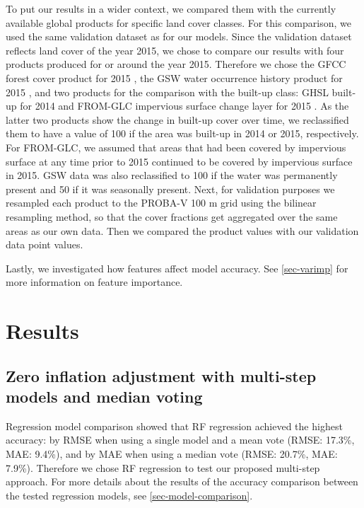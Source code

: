 \documentclass[review,authoryear,3p]{elsarticle}
\begin{document}
To put our results in a wider context, we compared them with the currently available global products for specific land cover classes.
For this comparison, we used the same validation dataset as for our models.
Since the validation dataset reflects land cover of the year 2015, we chose to compare our results with four products produced for or around the year 2015.
Therefore we chose the \gls{GFCC} forest cover product for 2015 \citep{townshend_global_2017}, the \gls{GSW} water occurrence history product for 2015 \citep{pekel_high-resolution_2016}, and two products for the comparison with the built-up class: \gls{GHSL} built-up for 2014 \citep{corbane_automated_2019} and \gls{FROM-GLC} impervious surface change layer for 2015 \citep{gong_annual_2020}.
As the latter two products show the change in built-up cover over time, we reclassified them to have a value of 100 if the area was built-up in 2014 or 2015, respectively.
For \gls{FROM-GLC}, we assumed that areas that had been covered by impervious surface at any time prior to 2015 continued to be covered by impervious surface in 2015.
\gls{GSW} data was also reclassified to 100 if the water was permanently present and 50 if it was seasonally present.
Next, for validation purposes we resampled each product to the PROBA-V 100 m grid using the bilinear resampling method, so that the cover fractions get aggregated over the same areas as our own data.
Then we compared the product values with our validation data point values.

Lastly, we investigated how features affect model accuracy. See \ref{sec-varimp} for more information on feature importance.

\section{Results}

\subsection{Zero inflation adjustment with multi-step models and median voting}

Regression model comparison showed that \gls{RF} regression achieved the highest accuracy: by \gls{RMSE} when using a single model and a mean vote (\gls{RMSE}: 17.3\%, \gls{MAE}: 9.4\%), and by \gls{MAE} when using a median vote (\gls{RMSE}: 20.7\%, MAE: 7.9\%).
Therefore we chose \gls{RF} regression to test our proposed multi-step approach.
For more details about the results of the accuracy comparison between the tested regression models, see \ref{sec-model-comparison}.
\end{document}

